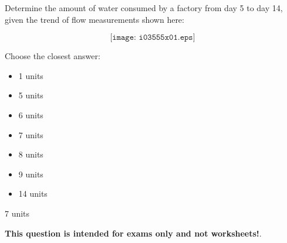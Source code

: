 

Determine the amount of water consumed by a factory from day 5 to day 14, given the trend of flow measurements shown here:

$$\texttt{[image: i03555x01.eps]}$$

Choose the closest answer:

\begin{itemize}
\item{} 1 units
\vskip 10pt 
\item{} 5 units
\vskip 10pt 
\item{} 6 units
\vskip 10pt 
\item{} 7 units
\vskip 10pt 
\item{} 8 units
\vskip 10pt 
\item{} 9 units
\vskip 10pt 
\item{} 14 units
\end{itemize}







7 units






{\bf This question is intended for exams only and not worksheets!}.



